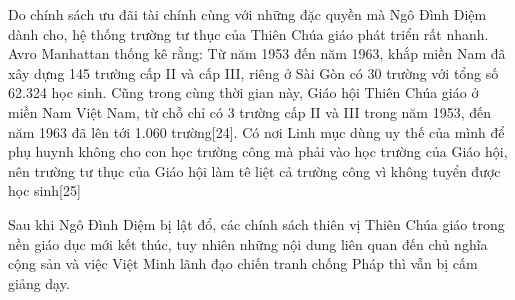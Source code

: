 \documentclass[../thesis.tex]{subfiles}
\begin{document}
Do chính sách ưu đãi tài chính cùng với những đặc quyền mà Ngô Đình Diệm dành cho, hệ thống trường tư thục của Thiên Chúa giáo phát triển rất nhanh. Avro Manhattan thống kê rằng: Từ năm 1953 đến năm 1963, khắp miền Nam đã xây dựng 145 trường cấp II và cấp III, riêng ở Sài Gòn có 30 trường với tổng số 62.324 học sinh. Cũng trong cùng thời gian này, Giáo hội Thiên Chúa giáo ở miền Nam Việt Nam, từ chỗ chỉ có 3 trường cấp II và III trong năm 1953, đến năm 1963 đã lên tới 1.060 trường[24]. Có nơi Linh mục dùng uy thế của mình để phụ huynh không cho con học trường công mà phải vào học trường của Giáo hội, nên trường tư thục của Giáo hội làm tê liệt cả trường công vì không tuyển được học sinh[25]

Sau khi Ngô Đình Diệm bị lật đổ, các chính sách thiên vị Thiên Chúa giáo trong nền giáo dục mới kết thúc, tuy nhiên những nội dung liên quan đến chủ nghĩa cộng sản và việc Việt Minh lãnh đạo chiến tranh chống Pháp thì vẫn bị cấm giảng dạy.
\end{document}
